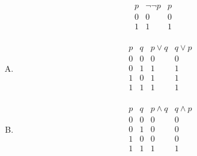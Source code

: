 {    %
    \begin{practices}
        \begin{table}[H]
            \[
                \begin{array}{c|c|c}
                    \hline
                    p & \neg \neg p & p \\
                    \hline
                    0 & 0 & 0 \\
                    1 & 1 & 1 \\
                \end{array}
            \]
        \end{table}
    \end{practices}

    \begin{practices}
        \begin{enumerate}[A.]
            \item
            {
                \begin{table}[H]
                    \[
                        \begin{array}{c|c|c|c}
                            \hline
                            p & q & p \vee q & q \vee p \\
                            \hline
                            0 & 0 & 0 & 0 \\
                            0 & 1 & 1 & 1 \\
                            1 & 0 & 1 & 1 \\
                            1 & 1 & 1 & 1 \\
                        \end{array}
                    \]
                \end{table}
            }
            \item
            {
                \begin{table}[H]
                    \[
                        \begin{array}{c|c|c|c}
                            \hline
                            p & q & p \wedge q & q \wedge p \\
                            \hline
                            0 & 0 & 0 & 0 \\
                            0 & 1 & 0 & 0 \\
                            1 & 0 & 0 & 0 \\
                            1 & 1 & 1 & 1 \\
                        \end{array}
                    \]
                \end{table}
            }
        \end{enumerate}
    \end{practices}

}
